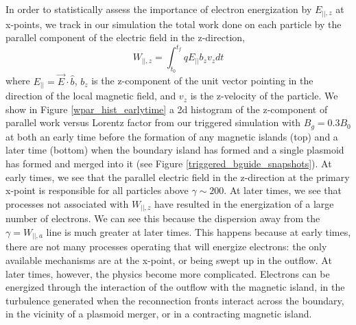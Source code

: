 \documentclass[iop,twocolappendix]{emulateapj}
\begin{document}
In order to statistically assess the importance of electron energization by $E_{||,z}$ at x-points, we track in our simulation the total work done on each particle by the parallel component of the electric field in the z-direction, $$W_{||,z}=\int_{t_{0}}^{t_{f}}{qE_{||}b_{z}}v_{z}dt$$ where $E_{||}=\vec{E}\cdot\hat{b}$, $b_{z}$ is the z-component of the unit vector pointing in the direction of the local magnetic field, and $v_{z}$ is the z-velocity of the particle.  We show in Figure \ref{wpar_hist_earlytime} a 2d histogram of the z-component of parallel work versus Lorentz factor from our triggered simulation with $B_{g}=0.3B_{0}$ at both an early time before the formation of any magnetic islands (top) and a later time (bottom) when the boundary island has formed and a single plasmoid has formed and merged into it (see Figure \ref{triggered_bguide_snapshots}).  At early times, we see that the parallel electric field in the z-direction at the primary x-point is responsible for all particles above $\gamma \sim 200$.  At later times, we see that processes not associated with $W_{||,z}$ have resulted in the energization of a large number of electrons.  We can see this because the dispersion away from the $\gamma=W_{||,a}$ line is much greater at later times.  This happens because at early times, there are not many processes operating that will energize electrons: the only available mechanisms are at the x-point, or being swept up in the outflow.  At later times, however, the physics become more complicated.  Electrons can be energized through the interaction of the outflow with the magnetic island, in the turbulence generated when the reconnection fronts interact across the boundary, in the vicinity of a plasmoid merger, or in a contracting magnetic island.  
\end{document}
